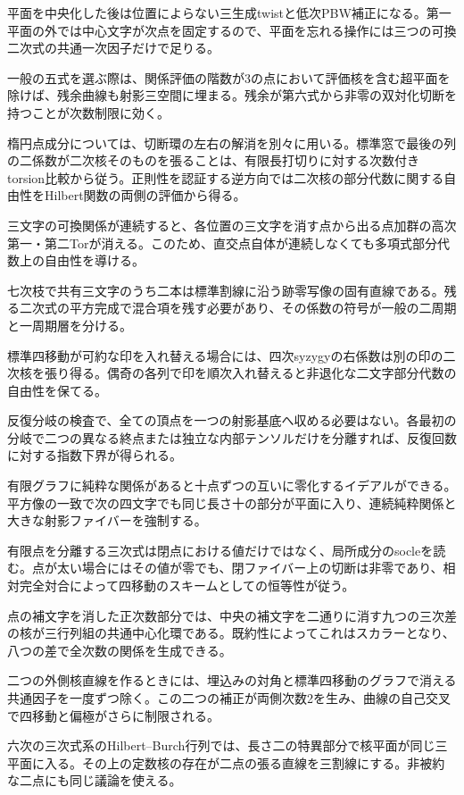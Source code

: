 \documentclass[11pt,a4paper]{ltjsarticle}
\begin{document}
平面を中央化した後は位置によらない三生成twistと低次PBW補正になる。第一平面の外では中心文字が次点を固定するので、平面を忘れる操作には三つの可換二次式の共通一次因子だけで足りる。

一般の五式を選ぶ際は、関係評価の階数が3の点において評価核を含む超平面を除けば、残余曲線も射影三空間に埋まる。残余が第六式から非零の双対化切断を持つことが次数制限に効く。

楕円点成分については、切断環の左右の解消を別々に用いる。標準窓で最後の列の二係数が二次核そのものを張ることは、有限長打切りに対する次数付きtorsion比較から従う。正則性を認証する逆方向では二次核の部分代数に関する自由性をHilbert関数の両側の評価から得る。

三文字の可換関係が連続すると、各位置の三文字を消す点から出る点加群の高次第一・第二Torが消える。このため、直交点自体が連続しなくても多項式部分代数上の自由性を導ける。

七次枝で共有三文字のうち二本は標準割線に沿う跡零写像の固有直線である。残る二次式の平方完成で混合項を残す必要があり、その係数の符号が一般の二周期と一周期層を分ける。

標準四移動が可約な印を入れ替える場合には、四次syzygyの右係数は別の印の二次核を張り得る。偶奇の各列で印を順次入れ替えると非退化な二文字部分代数の自由性を保てる。

反復分岐の検査で、全ての頂点を一つの射影基底へ収める必要はない。各最初の分岐で二つの異なる終点または独立な内部テンソルだけを分離すれば、反復回数に対する指数下界が得られる。

有限グラフに純粋な関係があると十点ずつの互いに零化するイデアルができる。平方像の一致で次の四文字でも同じ長さ十の部分が平面に入り、連続純粋関係と大きな射影ファイバーを強制する。

有限点を分離する三次式は閉点における値だけではなく、局所成分のsocleを読む。点が太い場合にはその値が零でも、閉ファイバー上の切断は非零であり、相対完全対合によって四移動のスキームとしての恒等性が従う。

点の補文字を消した正次数部分では、中央の補文字を二通りに消す九つの三次差の核が三行列組の共通中心化環である。既約性によってこれはスカラーとなり、八つの差で全次数の関係を生成できる。

二つの外側核直線を作るときには、埋込みの対角と標準四移動のグラフで消える共通因子を一度ずつ除く。この二つの補正が両側次数2を生み、曲線の自己交叉で四移動と偏極がさらに制限される。

六次の三次式系のHilbert--Burch行列では、長さ二の特異部分で核平面が同じ三平面に入る。その上の定数核の存在が二点の張る直線を三割線にする。非被約な二点にも同じ議論を使える。
\end{document}

